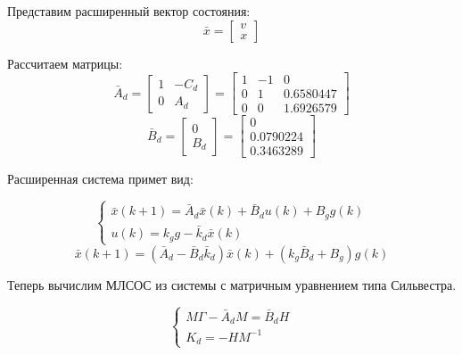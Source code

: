 \documentclass[a4paper,14pt]{extreport}
\begin{document}
Представим расширенный вектор состояния:
\begin{equation}
	\bar x = 
	\begin{bmatrix}
	v\\
	x
	\end{bmatrix}
\end{equation}

Рассчитаем матрицы:
\begin{equation}
	\bar A_d =
	\begin{bmatrix}
	1 & -C_d\\
	0 & A_d
	\end{bmatrix}
=
\begin{bmatrix}
1 & -1 & 0\\
0&1&    0.6580447  \\
0&0&    1.6926579  
\end{bmatrix}
\end{equation}
\begin{equation}
\bar B_d =
\begin{bmatrix}
0\\
B_d
\end{bmatrix}
=
\begin{bmatrix}
0\\
0.0790224\\  
0.3463289  
\end{bmatrix}
\end{equation}

Расширенная система примет вид:

\begin{equation}
	\begin{cases}
	\bar x(k+1) = \bar A_d \bar x(k) + \bar B_d u(k) + B_g g(k) \\
	u(k) = k_g g - \bar k_d \bar x(k)
	\end{cases}
\end{equation}
\begin{equation}
	\bar x(k+1) = (\bar A_d - \bar B_d \bar k_d) \bar x (k) +  (k_g \bar B_d + B_g) g(k)
\end{equation}

Теперь вычислим МЛСОС из системы с матричным уравнением типа Сильвестра.

\begin{equation}
	\begin{cases}
	M \Gamma - \bar A_d M = \bar B_d H\\
	K_d = - H M^{-1}
	\end{cases}
\end{equation}
\end{document}
